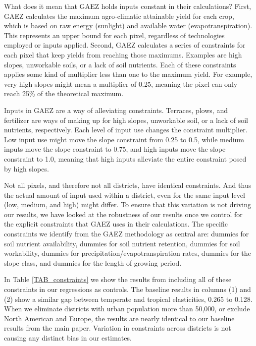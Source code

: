 \documentclass[11pt]{article}
\begin{document}
What does it mean that GAEZ holds inputs constant in their calculations? First, GAEZ calculates the maximum agro-climatic attainable yield for each crop, which is based on raw energy (sunlight) and available water (evapotranspiration). This represents an upper bound for each pixel, regardless of technologies employed or inputs applied. Second, GAEZ calculates a series of constraints for each pixel that keep yields from reaching those maximums. Examples are high slopes, unworkable soils, or a lack of soil nutrients. Each of these constraints applies some kind of multiplier less than one to the maximum yield. For example, very high slopes might mean a multiplier of 0.25, meaning the pixel can only reach 25\% of the theoretical maximum.

Inputs in GAEZ are a way of alleviating constraints. Terraces, plows, and fertilizer are ways of making up for high slopes, unworkable soil, or a lack of soil nutrients, respectively. Each level of input use changes the constraint multiplier. Low input use might move the slope constraint from 0.25 to 0.5, while medium inputs move the slope constraint to 0.75, and high inputs move the slope constraint to 1.0, meaning that high inputs alleviate the entire constraint posed by high slopes. 

Not all pixels, and therefore not all districts, have identical constraints. And thus the actual amount of input used within a district, even for the same input level (low, medium, and high) might differ. To ensure that this variation is not driving our results, we have looked at the robustness of our results once we control for the explicit constraints that GAEZ uses in their calculations. The specific constraints we identify from the GAEZ methodology as central are: dummies for soil nutrient availability, dummies for soil nutrient retention, dummies for soil workability, dummies for precipitation/evapotranspiration rates, dummies for the slope class, and dummies for the length of growing period. 

In Table \ref{TAB_constraints} we show the results from including all of these constraints in our regressions as controls. The baseline results in columns (1) and (2) show a similar gap between temperate and tropical elasticities, 0.265 to 0.128. When we eliminate districts with urban population more than 50,000, or exclude North American and Europe, the results are nearly identical to our baseline results from the main paper. Variation in constraints across districts is not causing any distinct bias in our estimates.
\end{document}
